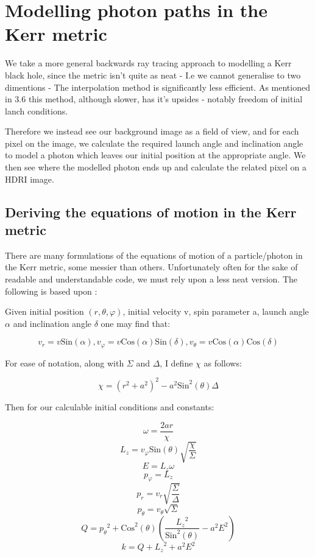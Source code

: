 \documentclass[oneside,openright,frontopenright]{dmathesis}
\begin{document}
\chapter{Modelling photon paths in the Kerr metric}

	We take a more general backwards ray tracing approach to modelling a Kerr black hole, since the metric isn't quite as neat - I.e we cannot generalise to two dimentions - The interpolation method is significantly less efficient. As mentioned in 3.6 this method, although slower, has it's upsides - notably freedom of initial lanch conditions.
	
	Therefore we instead see our background image as a field of view, and for each pixel on the image, we calculate the required launch angle and inclination angle to model a photon which leaves our initial position at the appropriate angle. We then see where the modelled photon ends up and calculate the related pixel on a HDRI image.

\section{Deriving the equations of motion in the Kerr metric}

	There are many formulations of the equations of motion of a particle/photon in the Kerr metric, some messier than others. Unfortunately often for the sake of readable and understandable code, we must rely upon a less neat version. The following is based upon \cite{yukterezKerr}:

	Given initial position $(r, \theta, \varphi)$, initial velocity v, spin parameter a, launch angle $\alpha$ and inclination angle $\delta$ one may find that:
	
	\[v_r = v\mbox{Sin}(\alpha), v_\varphi = v\mbox{Cos}(\alpha)\mbox{Sin}(\delta), v_\theta = v\mbox{Cos}(\alpha)\mbox{Cos}(\delta)\]

	For ease of notation, along with $\Sigma$ and $\Delta$, I define $\chi$ as follows:

	\[\chi = (r^2+a^2)^2-a^2\mbox{Sin}^2(\theta)\Delta\]

	Then for our calculable initial conditions and constants:

	\[\omega = \frac{2ar}{\chi}\]
	\[L_{z} = v_{\varphi}\mbox{Sin}(\theta)\sqrt{\frac{\chi}{\Sigma}}\]
	\[ E = L_{z}\omega\]
	\[p_{\varphi} = L_{z}\]
	\[p_{r} = v_{r}\sqrt{\frac{\Sigma}{\Delta}}\]
	\[p_{\theta} = v_{\theta}\sqrt{\Sigma}\]
	\[Q = {p_{\theta}}^2+\mbox{Cos}^2(\theta)\left(\frac{{L_{z}}^2}{\mbox{Sin}^2(\theta)}-a^2E^2\right)\]
	\[k = Q+{L_{z}}^2+a^2E^2\]
\end{document}
